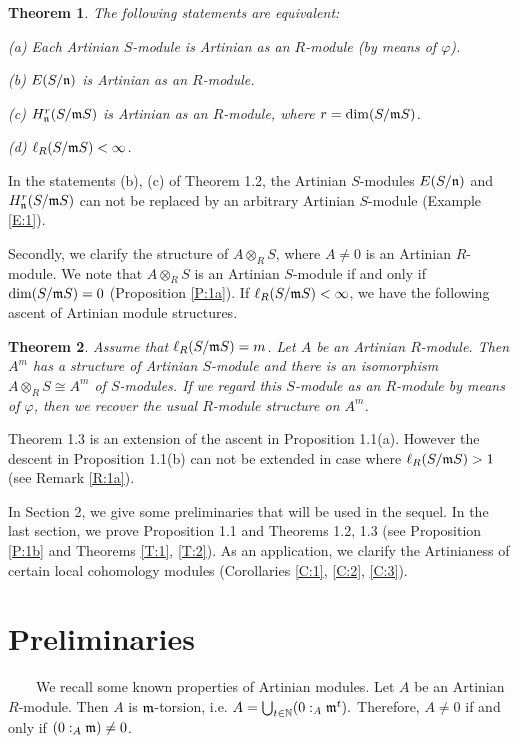 \documentclass[a4papersize]{article}
\newtheorem{theorem}{Theorem}[section]
\begin{document}
\begin{theorem}  The following statements are equivalent:

(a)  Each Artinian $S$-module is  Artinian as an $R$-module (by means of $\varphi$).

(b) $E(S/\frak n)$ is Artinian as an $R$-module.

(c) $H^r_{\frak n}(S/\frak mS)$ is Artinian as an $R$-module, where $r=\dim (S/\frak mS)$.

(d) $\ell_R(S/\frak m S)<\infty$.
\end{theorem}

In the statements (b), (c) of Theorem 1.2, the Artinian $S$-modules $E(S/\frak n)$ and $H^r_{\frak n}(S/\frak mS)$  can not be replaced by an arbitrary Artinian $S$-module (Example \ref{E:1}).

Secondly, we clarify the structure of $A\otimes_RS$, where $A\neq 0$ is an Artinian $R$-module. We note that $A\otimes_RS$ is an Artinian $S$-module if and only if $\dim (S/\frak mS)=0$ (Proposition \ref{P:1a}). If $\ell_R(S/\frak mS)<\infty$, we have the following ascent of Artinian module structures.

\begin{theorem} Assume that $\ell_R(S/\frak mS)=m$. Let $A$ be an Artinian $R$-module. Then  $A^m$ has a structure of Artinian $S$-module and there is an isomorphism $A\otimes_RS\cong A^m$ of $S$-modules. If we regard this $S$-module as an $R$-module by means of $\varphi$, then we recover the usual $R$-module structure on $A^m$.  
\end{theorem}

Theorem 1.3 is an extension of the ascent in Proposition 1.1(a). However the descent in Proposition 1.1(b) can not be extended in case where $\ell_R(S/\frak mS)>1$ (see Remark \ref{R:1a}). 
 

In Section 2, we give some preliminaries that will be used in the sequel. In the last section, we prove Proposition 1.1 and Theorems 1.2, 1.3  (see Proposition \ref{P:1b} and Theorems \ref{T:1}, \ref{T:2}). As an application, we clarify the Artinianess of certain local cohomology modules (Corollaries \ref{C:1}, \ref{C:2}, \ref{C:3}).

\section{Preliminaries}

\ \ \ \ We recall some known properties of Artinian modules. Let $A$ be an Artinian $R$-module. Then $A$ is $\frak m$-torsion, i.e. $A=\bigcup_{t\in \Bbb N}(0:_A\frak m^t).$ Therefore, $A\neq 0$ if and only if $(0:_A\frak m)\neq 0$. 
\end{document}
